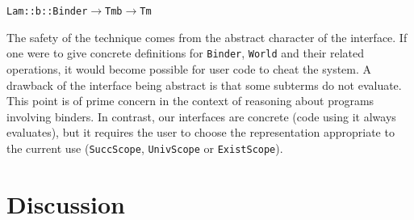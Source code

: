 \documentclass[9pt,authoryear]{sigplanconf}
\begin{document}
{{}\vphantom{$\{$}}\texttt{\mbox{\hspace{0.50em}}}\texttt{\mbox{\hspace{0.50em}}}\texttt{Lam}\texttt{\mbox{\hspace{0.50em}}}\texttt{{:}{:}}\texttt{\mbox{\hspace{0.50em}}}\texttt{\makebox[1.22ex][l]{$ {(} $}}\texttt{b}\texttt{\mbox{\hspace{0.50em}}}\texttt{{:}{:}}\texttt{\mbox{\hspace{0.50em}}}\texttt{Binder}\texttt{\makebox[1.22ex][r]{$ {)} $}}\texttt{\mbox{\hspace{0.50em}}}\texttt{$ \rightarrow $}\texttt{\mbox{\hspace{0.50em}}}\texttt{Tm}\texttt{\mbox{\hspace{0.50em}}}\texttt{\makebox[1.22ex][l]{$ {(} $}}\texttt{b}\texttt{\mbox{\hspace{0.50em}}}\texttt{\makebox[1.22ex][c]{\ensuremath{\triangleleft}}}\texttt{\mbox{\hspace{0.50em}}}\texttt{\makebox[1.22ex][c]{$ \alpha $}}\texttt{\makebox[1.22ex][r]{$ {)} $}}\texttt{\mbox{\hspace{0.50em}}}\texttt{$ \rightarrow $}\texttt{\mbox{\hspace{0.50em}}}\texttt{Tm}\texttt{\mbox{\hspace{0.50em}}}\texttt{\makebox[1.22ex][c]{$ \alpha $}}\texttt{{\nopagebreak \newline%
}\vphantom{$\{$}}%


%
%


%
The safety of the technique comes from the abstract character of the
    interface. If one were to give concrete definitions for \texttt{Binder},
    \texttt{World} and their related operations, it would become possible for
    user code to cheat the system.
    A drawback of the interface being abstract is that some subterms
    do not evaluate. This point is of prime concern in the context of
    reasoning about programs involving binders.
    In contrast, our interfaces are concrete (code using it always
    evaluates), but it requires the user to choose the representation
    appropriate to the current use (\texttt{SuccScope}, \texttt{UnivScope} or
    \texttt{ExistScope}).%


\section{Discussion\label{discussion}}
\end{document}
